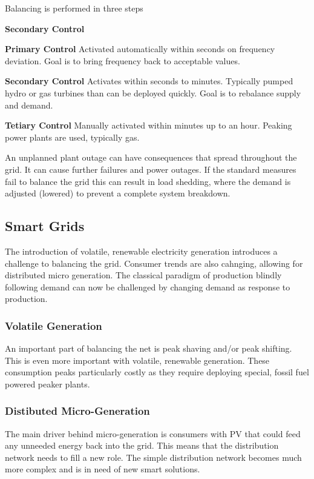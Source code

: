 Balancing is performed in three steps
\begin{labeling}{\textbf{Secondary Control}}
\item [\textbf{Primary Control}] Activated automatically within seconds on frequency deviation. Goal is to bring frequency back to acceptable values.
\item [\textbf{Secondary Control}] Activates within seconds to minutes. Typically pumped hydro or gas turbines than can be deployed quickly. Goal is to rebalance supply and demand.
\item [\textbf{Tetiary Control}] Manually activated within minutes up to an hour. Peaking power plants are used, typically gas.
\end{labeling}

An unplanned plant outage can have consequences that spread throughout the grid.
It can cause further failures and power outages.
If the standard measures fail to balance the grid this can result in load shedding, where the demand is adjusted (lowered) to prevent a complete system breakdown.

\subsection{Smart Grids}
The introduction of volatile, renewable electricity generation introduces a challenge to balancing the grid.
Consumer trends are also cahnging, allowing for distributed micro generation.
The classical paradigm of production blindly following demand can now be challenged by changing demand as response to production.

\subsubsection{Volatile Generation}
An important part of balancing the net is peak shaving and/or peak shifting.
This is even more important with volatile, renewable generation.
These consumption peaks particularly costly as they require deploying special, fossil fuel powered peaker plants.

\subsubsection{Distibuted Micro-Generation}
The main driver behind micro-generation is consumers with PV that could feed any unneeded energy back into the grid.
This means that the distribution network needs to fill a new role.
The simple distribution network becomes much more complex and is in need of new smart solutions.

